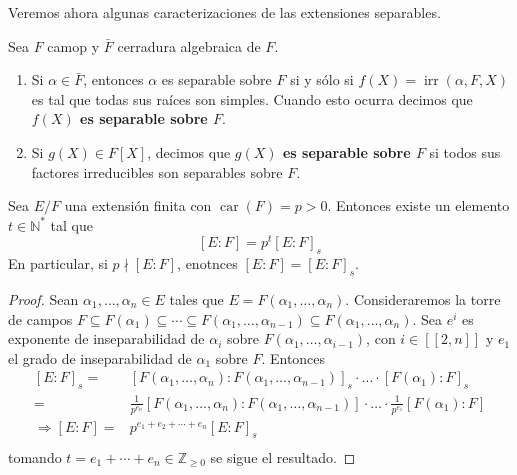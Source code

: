 \documentclass[12pt]{report}
\theoremstyle{largebreak}
\newcommand\natint[1]{\ensuremath{\left[\!\left[ #1\right]\!\right]}}
\DeclareMathOperator{\car}{car}
\DeclareMathOperator{\irr}{irr}
\begin{document}
    Veremos ahora algunas caracterizaciones de las extensiones separables.

    \begin{obs}
        Sea $F$ camop y $\bar{F}$ cerradura algebraica de $F$.
        \begin{enumerate}
            \item Si $\alpha\in\bar{F}$, entonces $\alpha$ es separable sobre $F$ si y sólo si $f(X)=\irr(\alpha, F, X)$ es tal que todas sus raíces son simples. Cuando esto ocurra decimos que \textbf{$f(X)$ es separable sobre $F$}.
            \item Si $g(X)\in F[X]$, decimos que \textbf{$g(X)$ es separable sobre $F$} si todos sus factores irreducibles son separables sobre $F$.
        \end{enumerate}
    \end{obs}

    \begin{propo}
        Sea $E/F$ una extensión finita con $\car(F)=p>0$. Entonces existe un elemento $t\in\mathbb{N}^{*}$ tal que
        \begin{equation}
            \left[E:F\right]=p^t\left[E:F\right]_s
        \end{equation}
        En particular, si $p\nmid \left[E:F\right]$, enotnces $\left[E:F\right]=\left[E:F\right]_s$.
    \end{propo}

    \begin{proof}
        Sean $\alpha_1,\dots,\alpha_n\in E$ tales que $E=F(\alpha_1,\dots,\alpha_n)$. Consideraremos la torre de campos $F\subseteq F(\alpha_1)\subseteq\cdots\subseteq F(\alpha_1,\dots,\alpha_{n-1})\subseteq F(\alpha_1,\dots,\alpha_n)$.
        Sea $e^{i}$ es exponente de inseparabilidad de $\alpha_i$ sobre $F(\alpha_1,\dots,\alpha_{i-1})$, con $i\in\natint{2,n}$ y $e_1$ el grado de inseparabilidad de $\alpha_1$ sobre $F$. Entonces
        \begin{equation*}
            \begin{split}
                \left[E:F\right]_s=&\left[F(\alpha_1,\dots,\alpha_n):F(\alpha_1,\dots,\alpha_{n-1})\right]_s\cdot\dots\cdot[F(\alpha_1):F]_s\\
                =&\frac{1}{p^{e_n}} \left[F(\alpha_1,\dots,\alpha_n):F(\alpha_1,\dots,\alpha_{n-1})\right]\cdot\dots\cdot\frac{1}{p^{e_1}}[F(\alpha_1):F]\\
                \Rightarrow [E:F]=&p^{e_1+e_2+\cdots+e_n}\left[E:F\right]_s\\
            \end{split}
        \end{equation*}
        tomando $t=e_1+\cdots+e_n\in\mathbb{Z}_{\geq0}$ se sigue el resultado.
    \end{proof}
\end{document}
